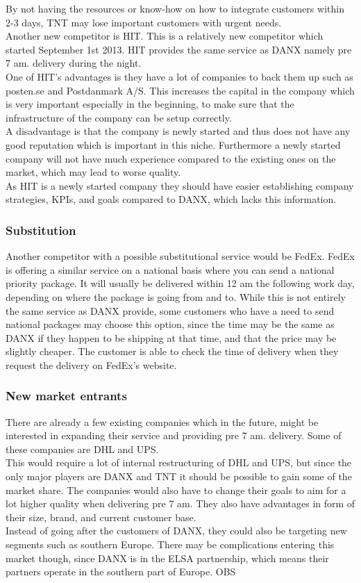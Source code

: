 By not having the resources or know-how on how to integrate customers within 2-3 days, TNT may lose important customers with urgent needs.\\
Another new competitor is HIT\cite{malene001}\cite{webpage002}. This is a relatively new competitor which started September 1st 2013\cite{webpage003}. HIT provides the same service as DANX namely pre 7 am. delivery during the night.\\
One of HIT’s advantages is they have a lot of companies to back them up such as posten.se and Postdanmark A/S. This increases the capital in the company which is very important especially in the beginning, to make sure that the infrastructure of the company can be setup correctly.\\
A disadvantage is that the company is newly started and thus does not have any good reputation which is important in this niche. Furthermore a newly started company will not have much experience compared to the existing ones on the market, which may lead to worse quality.\\
As HIT is a newly started company they should have easier establishing company strategies, KPIs, and goals compared to DANX, which lacks this information.  

\subsubsection{Substitution}
Another competitor with a possible substitutional service would be FedEx\cite{webpage004}. FedEx is offering a similar service on a national basis where you can send a national priority package. It will usually be delivered within 12 am the following work day, depending on where the package is going from and to. While this is not entirely the same service as DANX provide, some customers who have a need to send national packages may choose this option, since the time may be the same as DANX if they happen to be shipping at that time, and that the price may be slightly cheaper. The customer is able to check the time of delivery when they request the delivery on FedEx’s website.

\subsubsection{New market entrants}
There are already a few existing companies which in the future, might be interested in expanding their service and providing pre 7 am. delivery. Some of these companies are DHL and UPS.\\
This would require a lot of internal restructuring of DHL and UPS, but since the only major players are DANX and TNT it should be possible to gain some of the market share. The companies would also have to change their goals to aim for a lot higher quality when delivering pre 7 am. They also have advantages in form of their size, brand, and current customer base.\\
Instead of going after the customers of DANX, they could also be targeting new segments such as southern Europe. There may be complications entering this market though, since DANX is in the ELSA partnership, which means their partners operate in the southern part of Europe.
OBS

